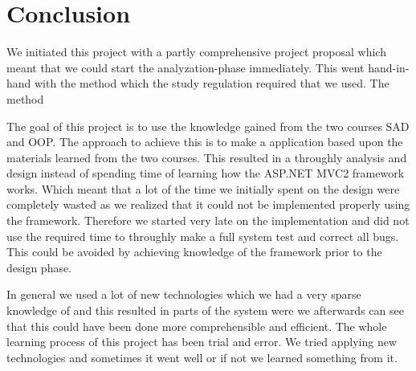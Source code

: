 \chapter{Conclusion}
\label{chap:conclusion}
We initiated this project with a partly comprehensive project proposal which meant that we could start the analyzation-phase immediately. This went hand-in-hand with the \ooad{} method which the study regulation required that we used. The \ooad{} method 


The goal of this project is to use the knowledge gained from the two courses SAD and OOP. The approach to achieve this is to make a application based upon the materials learned from the two courses. 
This resulted in a throughly analysis and design instead of spending time of learning how the ASP.NET MVC2 framework works.
Which meant that a lot of the time we initially spent on the design were completely wasted as we realized that it could not be implemented properly using the framework. 
Therefore we started very late on the implementation and did not use the required time to throughly make a full system test and correct all bugs. 
This could be avoided by achieving knowledge of the framework prior to the design phase. 




In general we used a lot of new technologies which we had a very sparse knowledge of and this resulted in parts of the system were we afterwards can see that this could have been done more comprehensible and efficient. 
The whole learning process of this project has been trial and error. 
We tried applying new technologies and sometimes it went well or if not we learned something from it. 


